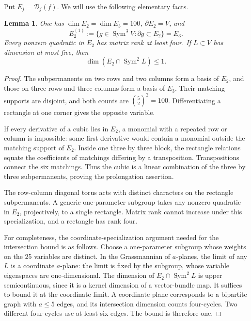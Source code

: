 \documentclass[11pt]{amsart}
\newtheorem{lemma}[theorem]{Lemma}
\theoremstyle{definition}
\numberwithin{equation}{section}
\newcommand{\Sym}{\operatorname{Sym}}
\newcommand{\cD}{\mathcal D}
\begin{document}
Put \(E_j=\cD_j(f)\). We will use the following elementary facts.
\begin{lemma}\label{lem:permanent}
One has \(\dim E_2=\dim E_3=100\), \(\partial E_2=V\), and
\[
 E_2^{(1)}:=\{g\in\Sym^3 V:\partial g\subset E_2\}=E_3.
\]
Every nonzero quadratic in \(E_2\) has matrix rank at least four. If
\(L\subset V\) has dimension at most five, then
\[\dim(E_2\cap\Sym^2L)\le1.\]
\end{lemma}
\begin{proof}
The subpermanents on two rows and two columns form a basis of \(E_2\),
and those on three rows and three columns form a basis of \(E_3\).
Their matching supports are disjoint, and both counts are \(\binom52^2=100\).
Differentiating a rectangle at one corner gives the opposite variable.

If every derivative of a cubic lies in \(E_2\), a monomial with a repeated
row or column is impossible: some first derivative would contain a monomial
outside the matching support of \(E_2\). Inside one three by three block,
the rectangle relations equate the coefficients of matchings differing by a
transposition. Transpositions connect the six matchings. Thus the cubic is
a linear combination of the three by three subpermanents, proving the
prolongation assertion.

The row-column diagonal torus acts with distinct characters on the rectangle
subpermanents. A generic one-parameter subgroup takes any nonzero quadratic
in \(E_2\), projectively, to a single rectangle. Matrix rank cannot increase
under this specialization, and a rectangle has rank four.

For completeness, the coordinate-specialization argument needed for the
intersection bound is as follows. Choose a one-parameter subgroup whose
weights on the 25 variables are distinct. In the Grassmannian of
\(a\)-planes, the limit of any \(L\) is a coordinate \(a\)-plane: the
limit is fixed by the subgroup, whose variable eigenspaces are one-dimensional.
The dimension of \(E_2\cap\Sym^2L\) is upper semicontinuous, since it is
a kernel dimension of a vector-bundle map. It suffices to bound it at the
coordinate limit. A coordinate plane corresponds to a bipartite graph with
\(a\le5\) edges, and its intersection dimension counts four-cycles.
Two different four-cycles use at least six edges. The bound is therefore one.
\end{proof}
\end{document}
